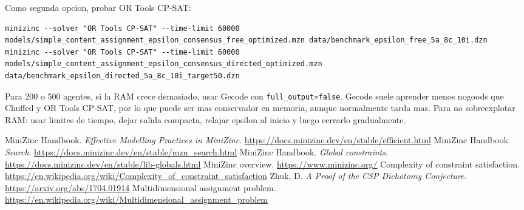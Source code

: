\documentclass[11pt,a4paper]{article}
\begin{document}
Como segunda opcion, probar OR Tools CP-SAT:
\begin{lstlisting}
minizinc --solver "OR Tools CP-SAT" --time-limit 60000 models/simple_content_assignment_epsilon_consensus_free_optimized.mzn data/benchmark_epsilon_free_5a_8c_10i.dzn
minizinc --solver "OR Tools CP-SAT" --time-limit 60000 models/simple_content_assignment_epsilon_consensus_directed_optimized.mzn data/benchmark_epsilon_directed_5a_8c_10i_target50.dzn
\end{lstlisting}

Para 200 o 500 agentes, si la RAM crece demasiado, usar Gecode con \texttt{full\_output=false}. Gecode suele aprender menos nogoods que Chuffed y OR Tools CP-SAT, por lo que puede ser mas conservador en memoria, aunque normalmente tarda mas. Para no sobreexplotar RAM: usar limites de tiempo, dejar salida compacta, relajar epsilon al inicio y luego cerrarlo gradualmente.

\begin{thebibliography}{9}
 MiniZinc Handbook. \textit{Effective Modelling Practices in MiniZinc}. \url{https://docs.minizinc.dev/en/stable/efficient.html}
 MiniZinc Handbook. \textit{Search}. \url{https://docs.minizinc.dev/en/stable/mzn_search.html}
 MiniZinc Handbook. \textit{Global constraints}. \url{https://docs.minizinc.dev/en/stable/lib-globals.html}
 MiniZinc overview. \url{https://www.minizinc.org/}
 Complexity of constraint satisfaction. \url{https://en.wikipedia.org/wiki/Complexity_of_constraint_satisfaction}
 Zhuk, D. \textit{A Proof of the CSP Dichotomy Conjecture}. \url{https://arxiv.org/abs/1704.01914}
 Multidimensional assignment problem. \url{https://en.wikipedia.org/wiki/Multidimensional_assignment_problem}
\end{thebibliography}
\end{document}

